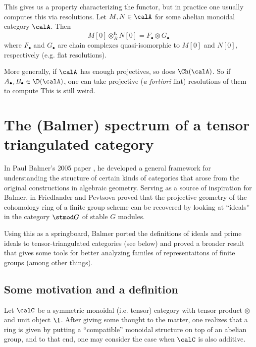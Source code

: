 \documentclass[12pt]{article}
\begin{document}
This gives us a property characterizing the functor, but in practice one usually computes this via resolutions. Let $M,N\in\calA$ for some abelian monoidal category $\calA$. Then 
\[M[0]\otimes^\mathbf{L}_R N[0]=F_\bullet\otimes G_\bullet\]
where $F_\bullet$ and $G_\bullet$ are chain complexes quasi-isomorphic to $M[0]$ and $N[0]$, respectively (e.g. flat resolutions).

More generally, if $\calA$ has enough projectives, so does $\Ch(\calA)$. So if $A_\bullet,B_\bullet\in\D(\calA)$, one can take projective (\textit{a fortiori} flat) 
resolutions of them to compute 
{\color{red} This is still weird.}


\newpage
\section{The (Balmer) spectrum of a tensor triangulated category}\label{sec:ttc}
In Paul Balmer's 2005 paper \cite{balmer-spc}, he developed a general framework for understanding the structure of certain 
kinds of categories that arose from the original constructions in algebraic geometry. Serving as a source of inspiration for Balmer, in \cite{friedlander-pevtsova-pi} Friedlander and Pevtsova proved
that the projective geometry of the cohomology ring of a finite group scheme can be recovered by looking at ``ideals'' in the category $\stmod G$ 
of stable $G$ modules.

Using this as a springboard, Balmer ported the definitions of ideals and prime ideals to tensor-triangulated categories (see below)
and proved a broader result that gives some tools for better analyzing familes of representaitons of finite groups (among other things).
\subsection{Some motivation and a definition}
Let $\calC$ be a symmetric monoidal (i.e. tensor) category with tensor product $\otimes$ and unit object $\1$. After giving some 
thought to the matter, one realizes that a ring is given by putting a ``compatible'' monoidal structure on top of an abelian group,
and to that end, one may consider the case when $\calC$ is also additive. 
\end{document}

